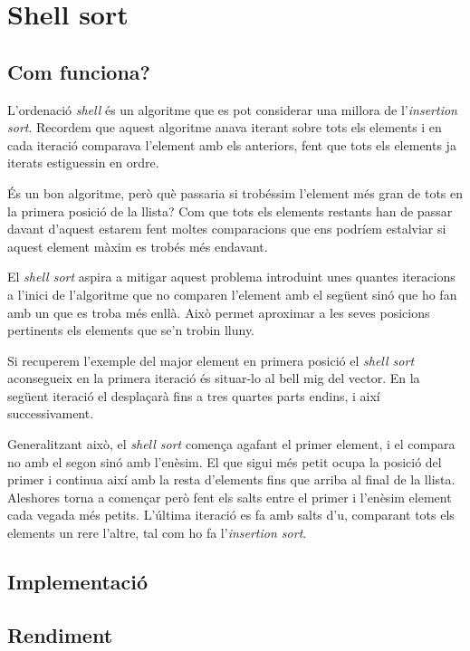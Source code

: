 \chapter{Shell sort}

\section{Com funciona?}
L'ordenació \textit{shell} és un algoritme que es pot considerar una millora de l'\textit{insertion sort}.
Recordem que aquest algoritme anava iterant sobre tots els elements i en cada iteració comparava l'element amb els anteriors, fent que tots els elements ja iterats estiguessin en ordre.

És un bon algoritme, però què passaria si trobéssim l'element més gran de tots en la primera posició de la llista?
Com que tots els elements restants han de passar davant d'aquest estarem fent moltes comparacions que ens podríem estalviar si aquest element màxim es trobés més endavant.

El \textit{shell sort} aspira a mitigar aquest problema introduint unes quantes iteracions a l'inici de l'algoritme que no comparen l'element amb el següent sinó que ho fan amb un que es troba més enllà.
Això permet aproximar a les seves posicions pertinents els elements que se'n trobin lluny.

Si recuperem l'exemple del major element en primera posició el \textit{shell sort} aconsegueix en la primera iteració és situar-lo al bell mig del vector.
En la següent iteració el desplaçarà fins a tres quartes parts endins, i així successivament.

Generalitzant això, el \textit{shell sort} comença agafant el primer element, i el compara no amb el segon sinó amb l'enèsim. El que sigui més petit ocupa la posició del primer i continua així amb la resta d'elements fins que arriba al final de la llista. Aleshores torna a començar però fent els salts entre el primer i l'enèsim element cada vegada més petits.
L'última iteració es fa amb salts d'u, comparant tots els elements un rere l'altre, tal com ho fa l'\textit{insertion sort}.

\section{Implementació}

\vspace{1em}

\begin{minipage}{\textwidth}
	\section{Rendiment}
	\noindent
	\makebox[\textwidth][c]{
		
	}
	\vspace*{1em}
	\begin{center}
		\resizebox{\textwidth}{!}{}
	\end{center}
\end{minipage}